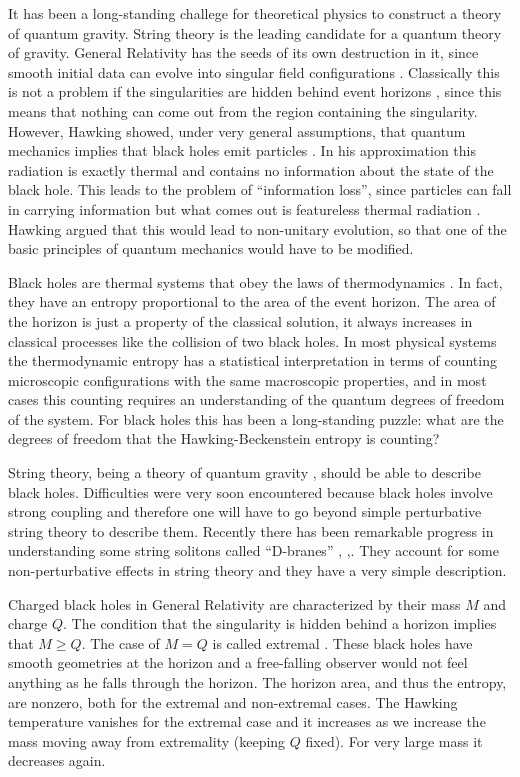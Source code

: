 It has been a long-standing challege for theoretical
physics to construct a theory of quantum gravity.
String theory is the leading candidate for a quantum
theory of gravity. 
General Relativity has the
seeds of its own destruction in it, since
smooth initial data can evolve into  singular field
configurations \penrose . Classically this is not a problem
if the singularities are hidden behind event 
horizons \censor , since this means that 
nothing can come out from the region containing the  singularity.
However, Hawking showed, under very general assumptions,
that quantum mechanics implies that  black holes
 emit particles \hawrad . 
In his approximation this radiation
is exactly thermal and contains no information 
about the state of the black hole. This leads
to the problem
of ``information loss'', since particles
can fall in carrying information but what comes
out is featureless thermal radiation \hawkinguni .
 Hawking
 argued that
this would lead to non-unitary evolution, so that
one of the basic principles of quantum mechanics
would have to be modified.


Black holes are thermal systems that obey the laws
of thermodynamics \hawkingentropy . In fact, they 
have an entropy
proportional to the area of the event horizon.
The area of the horizon is just a property of
the classical solution, it always increases
in classical processes like the collision of
two black holes. 
In most physical systems the thermodynamic entropy
has a statistical interpretation in terms of counting
microscopic configurations with the
same macroscopic properties, and in most cases
this counting  requires an understanding of the
quantum degrees of freedom of the system.
For black holes this has been a long-standing
puzzle: what are the degrees of freedom that
the Hawking-Beckenstein entropy is counting?


String theory, being a theory of quantum gravity \REV ,
should be able to describe black holes. 
Difficulties were very soon encountered because 
black holes involve strong coupling and therefore
one will have to go beyond simple perturbative
string theory to describe them. 
Recently there has been remarkable progress in
understanding some 
 string solitons called ``D-branes'' \daipol ,\polchinski 
,\polchinskinotes .
They account for some non-perturbative
effects in string theory and they have a very simple
description. 



Charged black holes in General Relativity are characterized
by their mass $M$ and charge $Q$. The condition that the
singularity is hidden behind a horizon implies that
$M \ge Q$.
The case of $ M=Q$ is called extremal \genrel .
These black holes have smooth geometries at the horizon
and a free-falling observer would not feel anything as he
falls through the horizon. The horizon area, and thus the entropy,
are nonzero, both for the extremal and non-extremal cases.
The Hawking temperature vanishes for the extremal case and
it increases as we increase the mass  moving
away from extremality (keeping $Q$ fixed).
  For very large mass it decreases again. 

